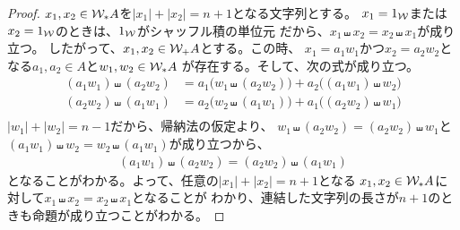 {\begin{proof}
	$x_1,x_2\in{\ensuremath{{\mathcal{W}}}}_*A$を$|x_1|+|x_2|=n+1$となる文字列とする。
	$x_1=1_{{\mathcal{W}}}$または$x_2=1_{{\mathcal{W}}}$のときは、$1_{{\mathcal{W}}}$がシャッフル積の単位元
	だから、$x_1\shuffle x_2=x_2\shuffle x_1$が成り立つ。
	したがって、$x_1,x_2\in{\ensuremath{{\mathcal{W}}}}_+A$とする。この時、
	$x_1=a_1w_1$かつ$x_2=a_2w_2$となる$a_1,a_2\in A$と$w_1,w_2\in{\ensuremath{{\mathcal{W}}}}_*A$
	が存在する。そして、次の式が成り立つ。
	\begin{equation}\label{eq:非単位同士のシャッフル積}\begin{split}
		(a_1w_1)\shuffle(a_2w_2) &= a_1\bigl(w_1\shuffle(a_2w_2)\bigr) 
			+ a_2\bigl((a_1w_1)\shuffle w_2\bigr) \\
		(a_2w_2)\shuffle(a_1w_1) &= a_2\bigl(w_2\shuffle(a_1w_1)\bigr) 
			+ a_1\bigl((a_2w_2)\shuffle w_1\bigr) \\
	\end{split}\end{equation}
	$|w_1|+|w_2|=n-1$だから、帰納法の仮定より、
	$w_1\shuffle(a_2w_2)=(a_2w_2)\shuffle w_1$と
	$(a_1w_1)\shuffle w_2=w_2\shuffle(a_1w_1)$が成り立つから、
	\begin{equation*}\begin{split}
		(a_1w_1)\shuffle(a_2w_2) = (a_2w_2)\shuffle(a_1w_1)
	\end{split}\end{equation*}
	となることがわかる。よって、任意の$|x_1|+|x_2|=n+1$となる
	$x_1,x_2\in{\ensuremath{{\mathcal{W}}}}_*A$に対して$x_1\shuffle x_2=x_2\shuffle x_1$となることが
	わかり、連結した文字列の長さが$n+1$のときも命題が成り立つことがわかる。
	

\end{proof}}
